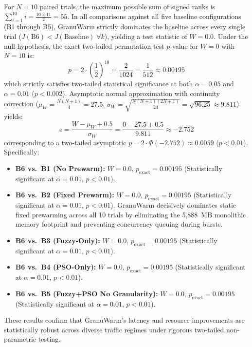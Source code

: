 \documentclass[final,5p,times,twocolumn]{elsarticle}
\begin{document}
For $N = 10$ paired trials, the maximum possible sum of signed ranks is $\sum_{i=1}^{10} i = \frac{10 \times 11}{2} = 55$. In all comparisons against all five baseline configurations (B1 through B5), GranuWarm strictly dominates the baseline across every single trial ($J(\text{B6}) < J(\text{Baseline}) \; \forall k$), yielding a test statistic of $W = 0.0$. Under the null hypothesis, the exact two-tailed permutation test $p$-value for $W = 0$ with $N = 10$ is:
\begin{equation}
p = 2 \cdot \left(\frac{1}{2}\right)^{10} = \frac{2}{1024} = \frac{1}{512} \approx 0.00195
\end{equation}
which strictly satisfies two-tailed statistical significance at both $\alpha = 0.05$ and $\alpha = 0.01$ ($p < 0.002$). Asymptotic normal approximation with continuity correction ($\mu_W = \frac{N(N+1)}{4} = 27.5$, $\sigma_W = \sqrt{\frac{N(N+1)(2N+1)}{24}} = \sqrt{96.25} \approx 9.811$) yields:
\begin{equation}
z = \frac{W - \mu_W + 0.5}{\sigma_W} = \frac{0 - 27.5 + 0.5}{9.811} \approx -2.752
\end{equation}
corresponding to a two-tailed asymptotic $p = 2 \cdot \Phi(-2.752) \approx 0.0059$ ($p < 0.01$). Specifically:
\begin{itemize}[leftmargin=*]
    \item \textbf{B6 vs.\ B1 (No Prewarm):} $W = 0.0, \, p_{\text{exact}} = 0.00195$ (Statistically significant at $\alpha = 0.01$, $p < 0.01$).
    \item \textbf{B6 vs.\ B2 (Fixed Prewarm):} $W = 0.0, \, p_{\text{exact}} = 0.00195$ (Statistically significant at $\alpha = 0.01$, $p < 0.01$). GranuWarm decisively dominates static fixed prewarming across all 10 trials by eliminating the 5,888~MB monolithic memory footprint and preventing concurrency queuing during bursts.
    \item \textbf{B6 vs.\ B3 (Fuzzy-Only):} $W = 0.0, \, p_{\text{exact}} = 0.00195$ (Statistically significant at $\alpha = 0.01$, $p < 0.01$).
    \item \textbf{B6 vs.\ B4 (PSO-Only):} $W = 0.0, \, p_{\text{exact}} = 0.00195$ (Statistically significant at $\alpha = 0.01$, $p < 0.01$).
    \item \textbf{B6 vs.\ B5 (Fuzzy+PSO No Granularity):} $W = 0.0, \, p_{\text{exact}} = 0.00195$ (Statistically significant at $\alpha = 0.01$, $p < 0.01$).
\end{itemize}
These results confirm that GranuWarm's latency and resource improvements are statistically robust across diverse traffic regimes under rigorous two-tailed non-parametric testing.
\end{document}
